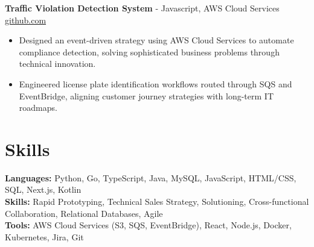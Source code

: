 \documentclass[11pt]{article}       %
\begin{document}

\textbf{Traffic Violation Detection System}{ - Javascript, AWS Cloud Services} \hfill \href{https://github.com/Monica20030707/AWS_rekonigition-N-read-database}{github.com} \\
\vspace{-9pt}
\begin{itemize}
  \item Designed an event-driven strategy using AWS Cloud Services to automate compliance detection, solving sophisticated business problems through technical innovation.
  \item Engineered license plate identification workflows routed through SQS and EventBridge, aligning customer journey strategies with long-term IT roadmaps.
\end{itemize}

\vspace{-18.5pt}

\section*{Skills}
\textbf{Languages:} Python, Go, TypeScript, Java, MySQL, JavaScript, HTML/CSS, SQL, Next.js, Kotlin\\
\textbf{Skills:} Rapid Prototyping, Technical Sales Strategy, Solutioning, Cross-functional Collaboration, Relational Databases, Agile\\
\textbf{Tools:} AWS Cloud Services (S3, SQS, EventBridge), React, Node.js, Docker, Kubernetes, Jira, Git\\

\vspace{-6.5pt}
\end{document}

